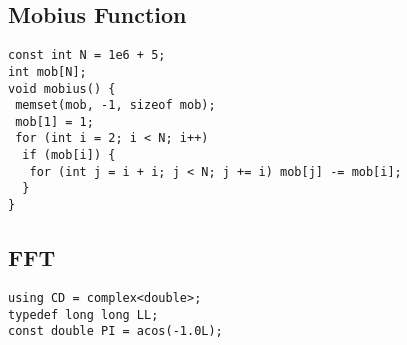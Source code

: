 \documentclass[a4paper,11pt,oneside]{article}
\begin{document}
\begin{multicols*}{\COLS}
\subsection{Mobius Function}
\begin{lstlisting}
const int N = 1e6 + 5;
int mob[N];
void mobius() {
 memset(mob, -1, sizeof mob);
 mob[1] = 1;
 for (int i = 2; i < N; i++)
  if (mob[i]) {
   for (int j = i + i; j < N; j += i) mob[j] -= mob[i];
  }
}

\end{lstlisting}
\subsection{FFT}
\begin{lstlisting}
using CD = complex<double>;
typedef long long LL;
const double PI = acos(-1.0L);


\end{lstlisting}
\end{multicols*}
\end{document}
